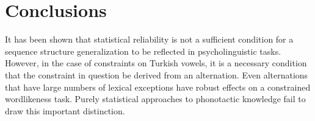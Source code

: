 


\section{Conclusions}

It has been shown that statistical reliability is not a sufficient condition for a sequence structure generalization to be reflected in psycholinguistic tasks. However, in the case of constraints on Turkish vowels, it is a necessary condition that the constraint in question be derived from an alternation. Even alternations that have large numbers of lexical exceptions have robust effects on a constrained wordlikeness task. Purely statistical approaches to phonotactic knowledge fail to draw this important distinction.

